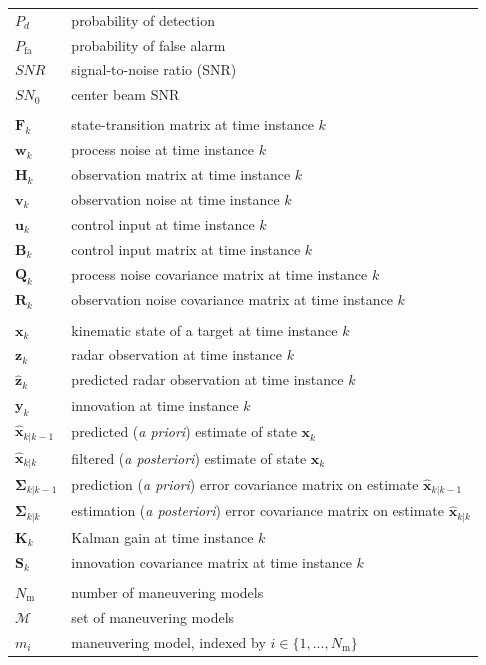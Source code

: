 \documentclass[english, 12pt, a4paper, elec, utf8, a-1b, online]{aaltothesis}
\numberwithin{equation}{section}
\renewcommand{\vec}[1]{\mathbf{#1}}
\newcommand{\xprior}{\hat{\vec{x}}_{k|k-1}}
\newcommand{\xpost}{\hat{\vec{x}}_{k|k}}
\newcommand{\priorecov}{\boldsymbol{\Sigma}_{k|k-1}}
\newcommand{\postecov}{\boldsymbol{\Sigma}_{k|k}}
\newcommand{\prefitinnov}{\vec{y}_k}
\newcommand{\x}{\vec{x}_k}
\newcommand{\z}{\vec{z}_k}
\newcommand{\stmodel}{\vec{F}_k}
\newcommand{\cimodel}{\vec{B}_k}
\newcommand{\cinput}{\vec{u}_k}
\newcommand{\pnoise}{\vec{w}_k}
\newcommand{\omodel}{\vec{H}_k}
\newcommand{\onoise}{\vec{v}_k}
\newcommand{\ocov}{\vec{R}_k}
\newcommand{\pcov}{\vec{Q}_k}
\newcommand{\innocov}{\vec{S}_k}
\newcommand{\gain}{\vec{K}_k}
\def\prior{\textit{a priori}}
\def\post{\textit{a posteriori}}
\newcommand{\zhat}{\hat{\vec{z}}_k}
\newcommand{\mimm}{\mathcal{M}}
\newcommand{\nmodels}{{N_\text{m}}}
\begin{document}
\begin{longtable}{ll}
$P_d$ & probability of detection \\
$P_\text{fa}$ & probability of false alarm \\
$SNR$ & signal-to-noise ratio (SNR) \\
$SN_0$ & center beam SNR \\
&\\
$\stmodel$ & state-transition matrix at time instance $k$\\
$\pnoise$ & process noise at time instance $k$\\
$\omodel$ & observation matrix at time instance $k$\\
$\onoise$ & observation noise at time instance $k$\\
$\cinput$ & control input at time instance $k$\\
$\cimodel$ & control input matrix at time instance $k$\\
$\pcov$ & process noise covariance matrix at time instance $k$\\
$\ocov$ & observation noise covariance matrix at time instance $k$\\
&\\
$\x$ & kinematic state of a target at time instance $k$ \\
$\z$ & radar observation at time instance $k$ \\
$\zhat$ & predicted radar observation at time instance $k$ \\
$\prefitinnov$ & innovation at time instance $k$ \\
$\xprior$ & predicted (\prior{}) estimate of state $\x$\\
$\xpost$ & filtered (\post{}) estimate of state $\x$ \\
$\priorecov$ & prediction (\prior{}) error covariance matrix on estimate $\xprior$ \\
$\postecov$ & estimation (\post{}) error covariance matrix on estimate $\xpost$ \\
$\gain$ & Kalman gain at time instance $k$ \\
$\innocov$ & innovation covariance matrix at time instance $k$ \\
&\\
$\nmodels$ & number of maneuvering models \\
$\mimm$ & set of maneuvering models \\
$m_i$ & maneuvering model, indexed by $i \in \{1, ..., \nmodels\}$ \\

\end{longtable}
\end{document}
